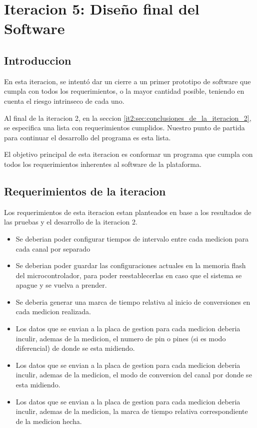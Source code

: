 \chapter{Iteracion 5: Diseño final del Software} %
\label{cha:iteracion_5}

\section{Introduccion} %
\label{it5:sec:introduccion}

En esta iteracion, se intentó dar un cierre a un primer prototipo de software que cumpla con todos los requerimientos, o la mayor cantidad posible, teniendo en cuenta el riesgo intrinseco de cada uno.

Al final de la iteracion 2, en la seccion \ref{it2:sec:conclusiones_de_la_iteracion_2}, se especifica una lista con requerimientos cumplidos. Nuestro punto de partida para continuar el desarrollo del programa es esta lista. 

El objetivo principal de esta iteracion es conformar un programa que cumpla con todos los requerimientos inherentes al software de la plataforma.


\section{Requerimientos de la iteracion} %
\label{it5:sec:requerimientos_de_la_iteracion}

Los requerimientos de esta iteracion estan planteados en base a los resultados de las pruebas y el desarrollo de la iteracion 2. 

\begin{itemize}
\item Se deberian poder configurar tiempos de intervalo entre cada medicion para cada canal por separado
\item Se deberian poder guardar las configuraciones actuales en la memoria flash del microcontrolador, para poder reestablecerlas en caso que el sistema se apague y se vuelva a prender.
\item Se deberia generar una marca de tiempo relativa al inicio de conversiones en cada medicion realizada.
\item Los datos que se envian a la placa de gestion para cada medicion deberia inculir, ademas de la medicion, el numero de pin o pines (si es modo diferencial) de donde se esta midiendo. 
\item Los datos que se envian a la placa de gestion para cada medicion deberia inculir, ademas de la medicion, el modo de conversion del canal por donde se esta midiendo.
\item Los datos que se envian a la placa de gestion para cada medicion deberia inculir, ademas de la medicion, la marca de tiempo relativa correspondiente de la medicion hecha. 
\end{itemize}



